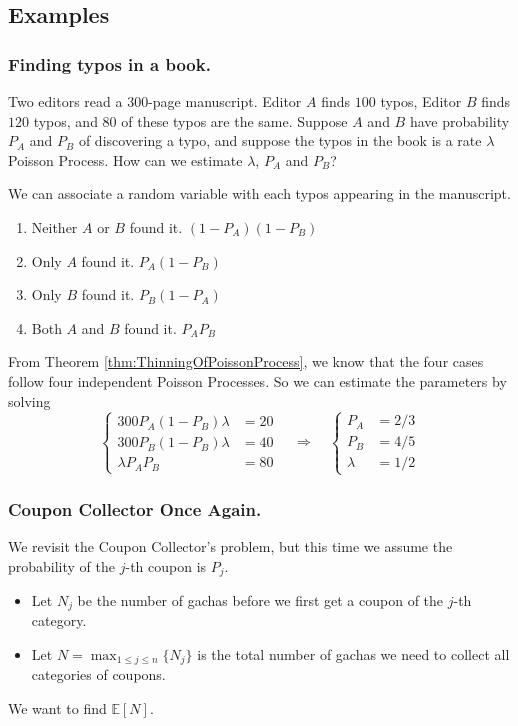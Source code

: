     \subsection{Examples}
        \subsubsection{Finding typos in a book.} Two editors read a 300-page manuscript. Editor $A$ finds $100$ typos, Editor $B$ finds $120$ typos, and $80$ of these typos are the same. Suppose $A$ and $B$ have probability $P_A$ and $P_B$ of discovering a typo, and suppose the typos in the book is a rate $\lambda$ Poisson Process. How can we estimate $\lambda$, $P_A$ and $P_B$?
    
        We can associate a random variable with each typos appearing in the manuscript.
        \begin{enumerate}
            \item Neither $A$ or $B$ found it. $(1-P_A)(1-P_B)$
            \item Only $A$ found it. $P_A(1-P_B)$
            \item Only $B$ found it. $P_B(1-P_A)$
            \item Both $A$ and $B$ found it. $P_AP_B$
        \end{enumerate}
        From Theorem \ref{thm:ThinningOfPoissonProcess}, we know that the four cases follow four independent Poisson Processes. So we can estimate the parameters by solving
        \[
        \begin{cases}
            300P_A(1-P_B)\lambda &= 20\\
            300P_B(1-P_B)\lambda &= 40\\
            \lambda P_AP_B &= 80
        \end{cases}
        \quad \Longrightarrow \quad
        \begin{cases}
            P_A &= 2/3\\
            P_B &= 4/5\\
            \lambda &= 1/2
        \end{cases}
        \]
    
        \subsubsection{Coupon Collector Once Again.}
        We revisit the Coupon Collector's problem, but this time we assume the probability of the $j$-th coupon is $P_j$.
        \begin{itemize}
            \item Let $N_j$ be the number of gachas before we first get a coupon of the $j$-th category.
            \item Let $N = \max_{1 \le j \le n}\{N_j\}$ is the total number of gachas we need to collect all categories of coupons.
        \end{itemize}
        We want to find $\mathbb{E}[N]$.

